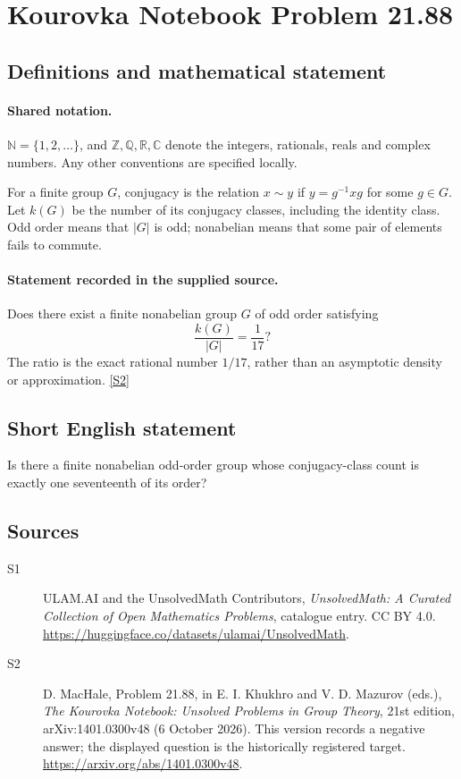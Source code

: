 \documentclass[11pt]{article}
\newcommand{\sref}[2]{\hyperlink{source:#1:#2}{[S#2]}}
\begin{document}
\section{Kourovka Notebook Problem 21.88}\label{statement}

\subsection{Definitions and mathematical statement}

\paragraph{Shared notation.}$\mathbb N=\{1,2,\ldots\}$, and $\mathbb Z,\mathbb Q,\mathbb R,\mathbb C$ denote the integers, rationals, reals and complex numbers. Any other conventions are specified locally.


For a finite group $G$, conjugacy is the relation $x\sim y$ if $y=g^{-1}xg$ for some $g\in G$. Let $k(G)$ be the number of its conjugacy classes, including the identity class. Odd order means that $|G|$ is odd; nonabelian means that some pair of elements fails to commute.
\paragraph{Statement recorded in the supplied source.}
Does there exist a finite nonabelian group $G$ of odd order satisfying
\[
 \frac{k(G)}{|G|}=\frac1{17}?
\]
The ratio is the exact rational number $1/17$, rather than an asymptotic density or approximation. \sref{statement}{2}
\subsection{Short English statement}
Is there a finite nonabelian odd-order group whose conjugacy-class count is exactly one seventeenth of its order?
\subsection{Sources}
\begin{description}
\item[\hypertarget{source:statement:1}{S1}] ULAM.AI and the UnsolvedMath Contributors, \emph{UnsolvedMath: A Curated Collection of Open Mathematics Problems}, catalogue entry. CC BY 4.0. \url{https://huggingface.co/datasets/ulamai/UnsolvedMath}.
\item[\hypertarget{source:statement:2}{S2}] D. MacHale, Problem 21.88, in E. I. Khukhro and V. D. Mazurov (eds.), \emph{The Kourovka Notebook: Unsolved Problems in Group Theory}, 21st edition, arXiv:1401.0300v48 (6 October 2026). This version records a negative answer; the displayed question is the historically registered target. \url{https://arxiv.org/abs/1401.0300v48}.
\end{description}
\label{end:statement}
\end{document}
